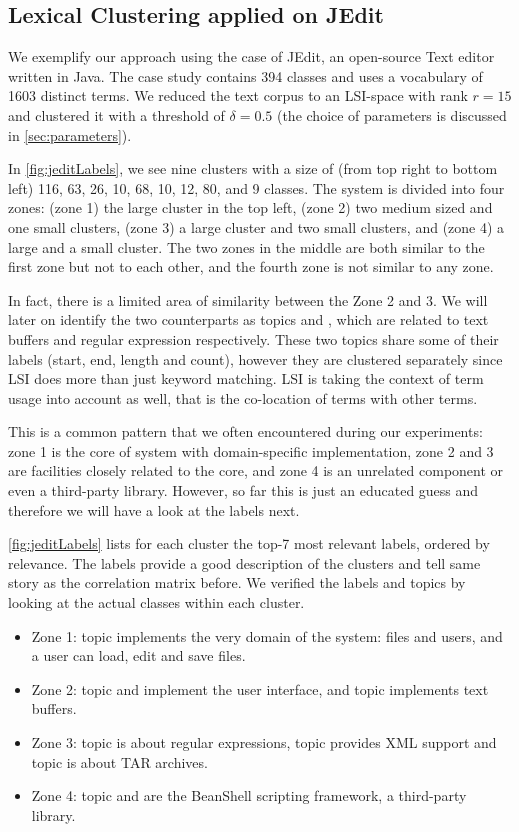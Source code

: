 \subsection{Lexical Clustering applied on JEdit}

We exemplify our approach using the case of JEdit, an open-source Text editor written in Java. The case study contains 394 classes and uses a vocabulary of 1603 distinct terms. We reduced the text corpus to an LSI-space with rank $r = 15$ and clustered it with a threshold of $\delta = 0.5$ (the choice of parameters is discussed in \autoref{sec:parameters}).

In \autoref{fig:jeditLabels}, we see nine clusters with a size of (from top right to bottom left) 116, 63, 26, 10, 68, 10, 12, 80, and 9 classes. The system is divided into four zones: (zone 1) the large cluster in the top left, (zone 2) two medium sized and one small clusters, (zone 3) a large cluster and two small clusters, and (zone 4) a large and a small cluster. The two zones in the middle are both similar to the first zone but not to each other, and the fourth zone is not similar to any zone.

In fact, there is a limited area of similarity between the Zone 2 and 3. We will later on identify the two counterparts as topics \pink and \cyan, which are related to text buffers and regular expression respectively. These two topics share some of their labels (\ie start, end, length and count), however they are clustered separately since LSI does more than just keyword matching. LSI is taking the context of term usage into account as well, that is the co-location of terms with other terms.

This is a common pattern that we often encountered during our experiments: zone 1 is the core of system with domain-specific implementation, zone 2 and 3 are facilities closely related to the core, and zone 4 is an unrelated component or even a third-party library. However, so far this is just an educated guess and therefore we will have a look at the labels next.

\autoref{fig:jeditLabels} lists for each cluster the top-7 most relevant labels, ordered by relevance. The labels provide a good description of the clusters and tell same story as the correlation matrix before. We verified the labels and topics by looking at the actual classes within each cluster.

\begin{itemize}
  \item Zone 1: topic \red implements the very domain of the system: files and users, and a user can load, edit and save files.
  \item Zone 2: topic \green and \magenta implement the user interface, and topic \pink implements text buffers.
  \item Zone 3: topic \cyan is about regular expressions, topic \yellow provides XML support and topic \darkgreen is about TAR archives.
  \item Zone 4: topic \blue and \orange are the BeanShell scripting framework, a third-party library.
\end{itemize}


